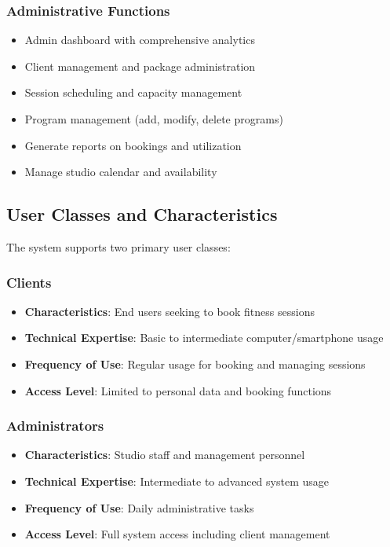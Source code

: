 \documentclass[12pt,a4paper]{article}
\begin{document}
\subsubsection{Administrative Functions}
\begin{itemize}
    \item Admin dashboard with comprehensive analytics
    \item Client management and package administration
    \item Session scheduling and capacity management
    \item Program management (add, modify, delete programs)
    \item Generate reports on bookings and utilization
    \item Manage studio calendar and availability
\end{itemize}

\subsection{User Classes and Characteristics}
The system supports two primary user classes:

\subsubsection{Clients}
\begin{itemize}
    \item \textbf{Characteristics}: End users seeking to book fitness sessions
    \item \textbf{Technical Expertise}: Basic to intermediate computer/smartphone usage
    \item \textbf{Frequency of Use}: Regular usage for booking and managing sessions
    \item \textbf{Access Level}: Limited to personal data and booking functions
\end{itemize}

\subsubsection{Administrators}
\begin{itemize}
    \item \textbf{Characteristics}: Studio staff and management personnel
    \item \textbf{Technical Expertise}: Intermediate to advanced system usage
    \item \textbf{Frequency of Use}: Daily administrative tasks
    \item \textbf{Access Level}: Full system access including client management
\end{itemize}
\end{document}
